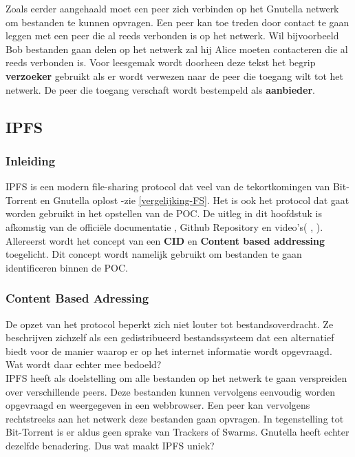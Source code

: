 Zoals eerder aangehaald moet een peer zich verbinden op het Gnutella netwerk om bestanden te kunnen opvragen. Een peer kan toe treden door contact te gaan leggen met een peer die al reeds verbonden is op het netwerk. Wil bijvoorbeeld Bob bestanden gaan delen op het netwerk zal hij Alice moeten contacteren die al reeds verbonden is. Voor leesgemak wordt doorheen deze tekst het begrip \textbf{verzoeker} gebruikt als er wordt verwezen naar de peer die toegang wilt tot het netwerk. De peer die toegang verschaft wordt bestempeld als \textbf{aanbieder}.\\


\subsection{IPFS}
\subsubsection{Inleiding}
IPFS is een modern file-sharing protocol dat veel van de tekortkomingen van Bit-Torrent en Gnutella oplost -zie \ref{vergelijking-FS}. Het is ook het protocol dat gaat worden gebruikt in het opstellen van de POC. De uitleg in dit hoofdstuk is afkomstig van de officiële documentatie \autocite{}, Github Repository \autocite{} en video's(\autocite{} , \autocite{}).\\

Allereerst wordt het concept van een \textbf{CID} en \textbf{Content based addressing} toegelicht. Dit concept wordt namelijk gebruikt om bestanden te gaan identificeren binnen de POC. %

\subsubsection{Content Based Adressing}
\label{CBA}
 De opzet van het protocol beperkt zich niet louter tot bestandsoverdracht. Ze beschrijven zichzelf als een gedistribueerd bestandssysteem dat een alternatief biedt voor de manier waarop er op het internet informatie wordt opgevraagd. Wat wordt daar echter mee bedoeld?\\

IPFS heeft als doelstelling om alle bestanden op het netwerk te gaan verspreiden over verschillende peers. Deze bestanden kunnen vervolgens eenvoudig worden opgevraagd en weergegeven in een webbrowser. Een peer kan vervolgens rechtstreeks aan het netwerk deze bestanden gaan opvragen. In tegenstelling tot Bit-Torrent is er aldus geen sprake van Trackers of Swarms. Gnutella heeft echter dezelfde benadering. Dus wat maakt IPFS uniek?\\

